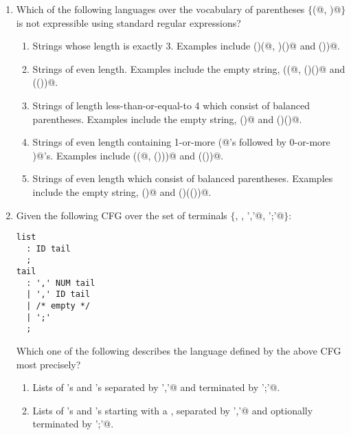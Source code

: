 \documentclass[12pt]{article}
\begin{document}
\begin{enumerate}

\item Which of the following languages over the vocabulary of
  parentheses $\{$\verb@(@, \verb@)@$\}$ is not expressible using
  standard regular expressions?

\begin{enumerate}

\item Strings whose length is exactly 3.  Examples include \verb@()(@,
  \verb@)()@ and \verb@())@.
  
\item Strings of even length.  Examples include
  the empty string, \verb@((@, \verb@()()@ and \verb@(())@.

\item Strings of length less-than-or-equal-to 4 which consist of
  balanced parentheses. 
    Examples include the empty string, \verb@()@ and \verb@()()@.

\item Strings of even length containing 1-or-more \verb@(@'s
  followed by 0-or-more \verb@)@'s.  Examples include \verb@((@,
  \verb@()))@ and \verb@(())@.

\item Strings of even length which consist of balanced parentheses.
  Examples include the empty string, \verb@()@ and \verb@()(())@.

\end{enumerate}

\item Given the following CFG over the set of terminals $\{$\verb@NUM@, \verb@ID@, \verb@','@, \verb@';'@$\}$:

\begin{verbatim}
list
  : ID tail
  ;
tail
  : ',' NUM tail
  | ',' ID tail
  | /* empty */
  | ';'
  ;
\end{verbatim}

Which one of the following describes the language defined by the above
CFG most precisely?

\begin{enumerate}

\item Lists of \verb@ID@'s and \verb@NUM@'s 
  separated by \verb@','@ and terminated by \verb@';'@.
  
\item Lists of \verb@ID@'s and \verb@NUM@'s starting with a \verb@ID@,
  separated by \verb@','@ and optionally terminated by \verb@';'@.


\end{enumerate}
\end{enumerate}
\end{document}
